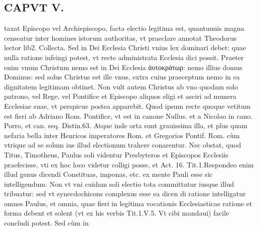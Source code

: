 \documentclass{article}
\begin{document}
\begin{pages}
\section*{CAPVT  V. }
\marginpar{[ p.347 ]}\pstart taxat Episcopo vel Archiepiscopo, facta electio legitima est, quantunuis magna censeatur inter homines istorum authoritas, vt praeclare annotat Theodorus lector lib2. Collecta. Sed in Dei Ecclesia Christi vnius lex dominari debet: quae nulla ratione infeingi potest, vt recte administrata Ecclesia dici possit. Praeter enim vnum Christum nemo est in Dei Ecclesia ἀυτοκράτωρ: nemo illius domus Dominus: sed solus Christus est ille vnus, extra cuius praeceptum nemo in ea dignitatem legitimam obtinet. Non vult autem Christus ab vno quodam solo patrono, vel Rege, vel Pontifice et Episcopo aliquos eligi et asciri ad munera Ecclesiae suae, vt perspicue postea apparebit. Quod ipsum recte quoque vetitum est fieri ab Adriano Rom. Pontifice, vt est in canone Nullus. et a Nicolao in cano. Porro, et can. seq. Distin.63. Atque  inde orta sunt grauissima illa, et plus quam nefaria bella inter Henricos imperatores Rom. et Gregorios Pontif. Rom. cùm vtrique ad se solum ius illud electionum trahere conarentur. Nec obstat, quod Titus, Timotheus, Paulus soli videntur Presbyteros et Episcopos Ecclesiis praefecisse, vti ex hoc loco videtur colligi posse, et Act. 16. Tit.1.Respondeo enim illud genus dicendi Constituas, imponas, etc. ex mente Pauli esse sic intelligendum: Non vt vni cuidam soli electio tota committatur iusque illud tribuatur: sed vt synecdochicons complexus esse ea dicen di ratione intelligatur omnes Paulus, et omnia, quae fieri in legitima vocationis Ecclesiasticae ratione et forma debent et solent (vt ex his verbis Tit.1.V.5. Vt cibi mandaui) facile concludi potest. Sed cùm in  \pend

\end{pages}
\end{document}
